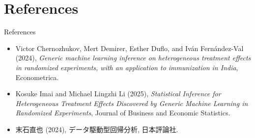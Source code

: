 \documentclass[xcolor=svgnames,aspectratio=169]{beamer}
\begin{document}
\section{References}

\begin{frame}{References}
    \begin{itemize}
        \item Victor Chernozhukov, Mert Demirer, Esther Duflo, and Iván Fernández-Val (2024), \textit{Generic machine learning inference on heterogeneous treatment effects in randomized experiments, with an application to immunization in India}, Econometrica.
        \item Kosuke Imai and Michael Lingzhi Li (2025), \textit{Statistical Inference for Heterogeneous Treatment Effects Discovered by Generic Machine Learning in Randomized Experiments}, Journal of Business and Economic Statistics.
        \item 末石直也 (2024), データ駆動型回帰分析, 日本評論社.
    \end{itemize}
\end{frame}
\end{document}
